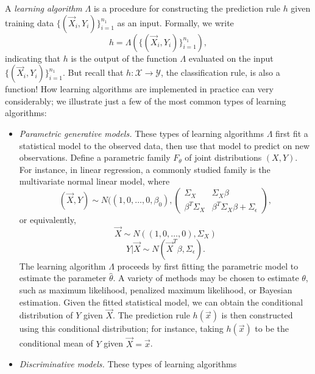 A \emph{learning algorithm} $\Lambda$ is a procedure for constructing the
prediction rule $h$ given training data $\{(\vec{X}_i,Y_i)\}_{i=1}^{n_1}$ as
an input.  Formally, we write
\[
h = \Lambda(\{(\vec{X}_i,Y_i)\}_{i=1}^{n_1}),
\]
indicating that $h$ is the output of the function $\Lambda$ evaluated
on the input $\{(\vec{X}_i,Y_i)\}_{i=1}^{n_1}$.  But recall that $h:
\mathcal{X} \to \mathcal{Y}$, the classification rule, is also a
function!  How learning algorithms are implemented in practice can
very considerably; we illustrate just a few of the most common types
of learning algorithms:

\begin{itemize}
\item \emph{Parametric generative models.}  These types of learning
  algorithms $\Lambda$ first fit a statistical model to the observed
  data, then use that model to predict on new observations. Define a
  parametric family $F_\theta$ of joint distributions $(X, Y)$.  For
  instance, in linear regression, a commonly studied family is the
  multivariate normal linear model, where
\[
(\vec{X}, Y) \sim N((1,0,\hdots,0, \beta_0), \begin{pmatrix}\Sigma_X & \Sigma_X \beta \\
\beta^T \Sigma_X & \beta^T \Sigma_X \beta + \Sigma_\epsilon\end{pmatrix},
\]
or equivalently,
\[
\vec{X} \sim N((1,0,\hdots,0), \Sigma_X)
\]
\[
Y|\vec{X} \sim N(\vec{X}^T \beta, \Sigma_\epsilon).
\]
The learning algorithm $\Lambda$ proceeds by first fitting the
parametric model to estimate the parameter $\hat{\theta}$.  A variety
of methods may be chosen to estimate $\theta$, such as maximum
likelihood, penalized maximum likelihood, or Bayesian estimation.
Given the fitted statistical model, we can obtain the conditional
distribution of $Y$ given $\vec{X}$.  The prediction rule $h(\vec{x})$
is then constructed using this conditional distribution; for instance,
taking $h(\vec{x})$ to be the conditional mean of $Y$ given $\vec{X} =
\vec{x}$.
\item \emph{Discriminative models.} These types of learning algorithms

\end{itemize}
